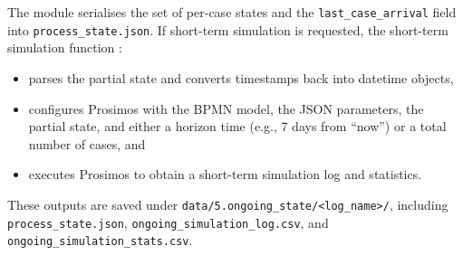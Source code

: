 \documentclass[a4paper,fleqn]{cas-sc}
\begin{document}
The module serialises the set of per-case states and the
\verb|last_case_arrival| field into \verb|process_state.json|.
If short-term simulation is requested, the short-term simulation function
\citep{Avramenko2025arXiv}:

\begin{itemize}
  \item parses the partial state and converts timestamps back
  into datetime objects,
  \item configures Prosimos with the BPMN model, the JSON
  parameters, the partial state, and either a horizon time
  (e.g., 7 days from ``now'') or a total number of cases, and
  \item executes Prosimos to obtain a short-term simulation
  log and statistics.
\end{itemize}

These outputs are saved under
\verb|data/5.ongoing_state/<log_name>/|, including
\verb|process_state.json|,
\verb|ongoing_simulation_log.csv|, and
\verb|ongoing_simulation_stats.csv|.
\end{document}
